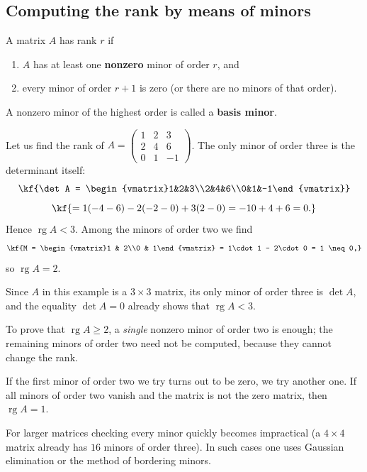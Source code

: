 \subsection{Computing the rank by means of minors}
\vspace{3pt}
\begin{tarif}
A matrix $A$ has rank $r$ if
\begin{enumerate}[label=\arabic*)]
\item $A$ has at least one \textbf{nonzero} minor of order $r$, and
\item every minor of order $r+1$ is zero (or there are no minors of that order).
\end{enumerate}
A nonzero minor of the highest order is called a \textbf{basis minor}.
\end{tarif}
\begin{misol}
Let us find the rank of
$A=\begin{pmatrix}1 & 2 & 3\\ 2 & 4 & 6\\ 0 & 1 & -1\end{pmatrix}$.
The only minor of order three is the determinant itself:
\[\kf{\det A = \begin{vmatrix}1&2&3\\2&4&6\\0&1&-1\end{vmatrix}}\]
\[\kf{= 1(-4-6) - 2(-2-0) + 3(2-0) = -10 + 4 + 6 = 0.}\]
Hence $\operatorname{rg}A < 3$. Among the minors of order two we find
\[\kf{M = \begin{vmatrix}1 & 2\\0 & 1\end{vmatrix} = 1\cdot 1 - 2\cdot 0 = 1 \neq 0,}\]
so $\operatorname{rg}A = 2$.
\end{misol}
\begin{izoh}
Since $A$ in this example is a $3\times 3$ matrix, its only minor of order
three is $\det A$, and the equality $\det A=0$ already shows that
$\operatorname{rg}A<3$.

To prove that $\operatorname{rg}A\ge 2$, a \emph{single} nonzero minor of
order two is enough; the remaining minors of order two need not be computed,
because they cannot change the rank.

If the first minor of order two we try turns out to be zero, we try another
one. If all minors of order two vanish and the matrix is not the zero matrix,
then $\operatorname{rg}A=1$.

For larger matrices checking every minor quickly becomes impractical (a
$4\times 4$ matrix already has $16$ minors of order three). In such cases one
uses Gaussian elimination or the method of bordering minors.
\end{izoh}
